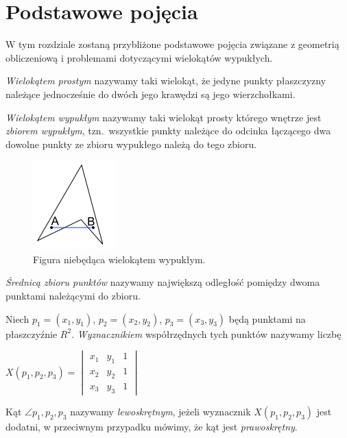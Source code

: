 \chapter{Podstawowe pojęcia}\label{chap:pojecia}
W tym rozdziale zostaną przybliżone podstawowe pojęcia związane
z geometrią obliczeniową i problemami dotyczącymi wielokątów
wypukłych.

\begin{definicja}
  \emph{Wielokątem prostym} nazywamy taki wielokąt, że jedyne punkty
  płaszczyzny należące jednocześnie do dwóch jego krawędzi są jego
  wierzchołkami.
\end{definicja}

\begin{definicja}
  \emph{Wielokątem wypukłym} nazywamy taki wielokąt prosty którego
  wnętrze jest \emph{zbiorem wypukłym}, tzn.\ wszystkie punkty
  należące do odcinka łączącego dwa dowolne punkty ze zbioru wypukłego
  należą do tego zbioru.
\end{definicja}

\begin{figure}[htb]
  \centering
  \includegraphics{img/nonconvex}
  \caption{Figura niebędąca wielokątem wypukłym.}
\end{figure}

\begin{definicja}
  \emph{Średnicą zbioru punktów} nazywamy największą odległość
  pomiędzy dwoma punktami należącymi do zbioru.
\end{definicja}

\begin{definicja}
  Niech $p_{1}=(x_{1},y_{1})$, $p_{2}=(x_{2},y_{2})$,
  $p_{3}=(x_{3},y_{3})$ będą punktami na płaszczyźnie
  $R^2$. \emph{Wyznacznikiem} współrzędnych tych punktów nazywamy
  liczbę

  \begin{center}
    \begin{math}
      X(p_1, p_2, p_3) =
      \begin{vmatrix}
        x_1 & y_1 & 1 \\
        x_2 & y_2 & 1 \\
        x_3 & y_3 & 1
      \end{vmatrix}
    \end{math}
  \end{center}

  Kąt $\angle p_{1},p_{2},p_{3}$ nazywamy \emph{lewoskrętnym}, jeżeli
  wyznacznik $X(p_1, p_2, p_3)$ jest dodatni, w przeciwnym przypadku
  mówimy, że kąt jest \emph{prawoskrętny}.
\end{definicja}

